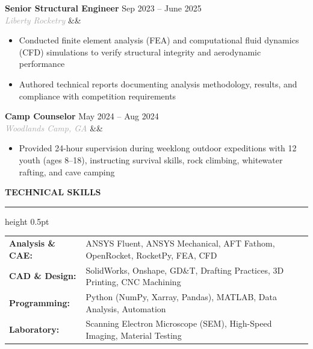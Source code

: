 \documentclass[10pt,letterpaper]{article}
\renewcommand{\section}[1]{
    \vspace{5pt}
    {\normalsize\bfseries\textcolor{navyblue}{\MakeUppercase{#1}}}
    \vspace{0pt}
    
    {\color{navyblue}\hrule height 0.5pt}
    \vspace{3pt}
}
\newcommand{\resumeEntry}[4]{
    \textbf{#1} \hfill \textcolor{medgray}{#2} \\
    \textit{\textcolor{darkgray}{#3}} \ifx&#4&\else\hfill \textcolor{medgray}{#4}\fi
    \vspace{0pt}
}
\begin{document}
\vspace{1pt}

\resumeEntry{Senior Structural Engineer}{Sep 2023 -- June 2025}{Liberty Rocketry}{}
\begin{itemize}
    \item Conducted finite element analysis (FEA) and computational fluid dynamics (CFD) simulations to verify structural integrity and aerodynamic performance
    \item Authored technical reports documenting analysis methodology, results, and compliance with competition requirements
\end{itemize}

\vspace{1pt}

\resumeEntry{Camp Counselor}{May 2024 -- Aug 2024}{Woodlands Camp, GA}{}
\begin{itemize}
    \item Provided 24-hour supervision during weeklong outdoor expeditions with 12 youth (ages 8--18), instructing survival skills, rock climbing, whitewater rafting, and cave camping
\end{itemize}

\vspace{1pt}

\section{Technical Skills}

\begin{tabularx}{\textwidth}{@{}>{}l X@{}}
\textbf{Analysis \& CAE:} & ANSYS Fluent, ANSYS Mechanical, AFT Fathom, OpenRocket, RocketPy, FEA, CFD \\[2pt]
\textbf{CAD \& Design:} & SolidWorks, Onshape, GD\&T, Drafting Practices, 3D Printing, CNC Machining \\[2pt]
\textbf{Programming:} & Python (NumPy, Xarray, Pandas), MATLAB, Data Analysis, Automation \\[2pt]
\textbf{Laboratory:} & Scanning Electron Microscope (SEM), High-Speed Imaging, Material Testing \\
\end{tabularx}

\vspace{1pt}

\end{document}
